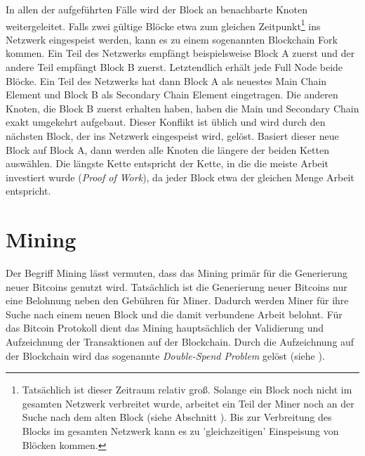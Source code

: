 \documentclass[ngerman,runningheads,a4paper]{llncs}[2018/03/10]
\newcommand{\commentatside}[1]{\pdfcomment[color={0.045 0.278 0.643},icon=Note]{#1}}
\newcommand{\todo}[1]{\commentatside{#1}}
\begin{document}
In allen der aufgeführten Fälle wird der Block an benachbarte Knoten weitergeleitet. Falls zwei gültige Blöcke etwa zum gleichen Zeitpunkt\footnote{Tatsächlich ist dieser Zeitraum relativ groß. Solange ein Block noch nicht im gesamten Netzwerk verbreitet wurde, arbeitet ein Teil der Miner noch an der Suche nach dem alten Block (siehe Abschnitt ). Bis zur Verbreitung des Blocks im gesamten Netzwerk kann es zu 'gleichzeitigen' Einspeisung von Blöcken kommen.} ins Netzwerk eingespeist werden, kann es zu einem sogenannten Blockchain Fork kommen. Ein Teil des Netzwerks empfängt beispielsweise Block A zuerst und der andere Teil empfängt Block B zuerst. Letztendlich erhält jede Full Node beide Blöcke. Ein Teil des Netzwerks hat dann Block A als neuestes Main Chain Element und Block B als Secondary Chain Element eingetragen. Die anderen Knoten, die Block B zuerst erhalten haben, haben die Main und Secondary Chain exakt umgekehrt aufgebaut. Dieser Konflikt ist üblich und wird durch den nächsten Block, der ins Netzwerk eingespeist wird, gelöst. Basiert dieser neue Block auf Block A, dann werden alle Knoten die längere der beiden Ketten auswählen. Die längste Kette entspricht der Kette, in die die meiste Arbeit investiert wurde (\textit{Proof of Work}), da jeder Block etwa der gleichen Menge Arbeit entspricht.

\section{Mining}\label{sec:mining}

Der Begriff Mining lässt vermuten, dass das Mining primär für die Generierung neuer Bitcoins genutzt wird. Tatsächlich ist die Generierung neuer Bitcoins nur eine Belohnung neben den Gebühren für Miner. Dadurch werden Miner für ihre Suche nach einem neuen Block und die damit verbundene Arbeit belohnt. Für das Bitcoin Protokoll dient das Mining hauptsächlich der Validierung und Aufzeichnung der Transaktionen auf der Blockchain. Durch die Aufzeichnung auf\todo{"auf" oder "in" hier} der Blockchain wird das sogenannte \textit{Double-Spend Problem} gelöst (siehe ).
\end{document}
